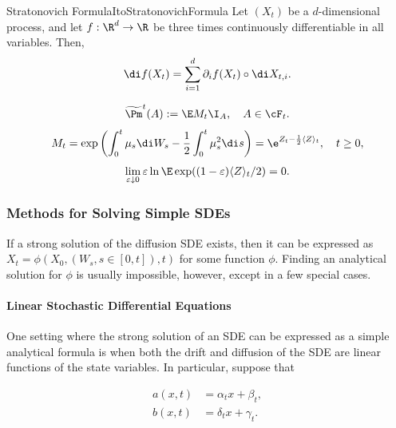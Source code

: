 \begin{prop}{\Ito \; Stratonovich Formula}{ItoStratonovichFormula}
	Let \((X_t)\) be a \(d\)-dimensional \Ito process, and let \(f : \R^d \to \R\) be three times continuously differentiable in all variables. Then,
	\begin{equation}
		\di f(X_t) = \sum_{i=1}^d \partial_i f(X_t) \circ \di X_{t,i}.
		\label{eq:ItoStratonovichFormula}
	\end{equation}
\end{prop}
\begin{equation}\label{eq:ChangeOfMeasureDef}
	\widetilde{\Pm}^t(A) := \E M_t \I_A, \quad A \in \cF_t.
\end{equation}
\begin{equation}\label{eq:ExponentialMartingaleDef}
	M_t = \exp\left(\int_0^t \mu_s \di W_s - \frac{1}{2} \int_0^t \mu_s^2 \di s\right) = \e^{Z_t - \frac{1}{2}\langle Z \rangle_t}, \quad t \ge 0,
\end{equation}
\begin{equation}\label{eq:KrylovCondition}
	\lim_{\varepsilon \downarrow 0} \varepsilon \ln \E \exp((1 - \varepsilon)\langle Z \rangle_t / 2) = 0.
\end{equation}

\subsubsection{Methods for Solving Simple SDEs}

If a strong solution of the \Ito{} diffusion SDE exists, then it can be expressed as \(X_t = \phi(X_0,(W_s, s \in [0,t]), t)\) for some function \(\phi\). Finding an analytical solution for \(\phi\) is usually impossible, however, except in a few special cases.

\paragraph{Linear Stochastic Differential Equations}

One setting where the strong solution of an SDE can be expressed as a simple analytical formula is when both the drift and diffusion of the SDE are linear functions of the state variables. In particular, suppose that

\begin{align*}
	a(x, t) & = \alpha_t x + \beta_t,  \\
	b(x, t) & = \delta_t x + \gamma_t.
\end{align*}

